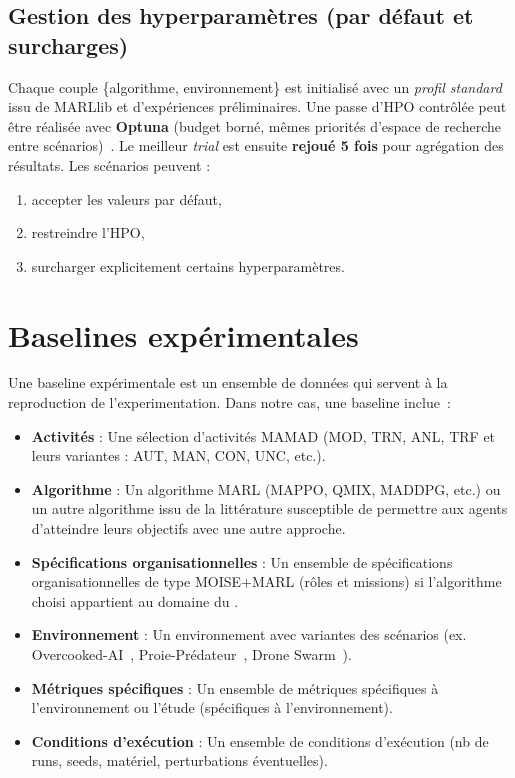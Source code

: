 \subsection{Gestion des hyperparamètres (par défaut et surcharges)}
Chaque couple \{algorithme, environnement\} est initialisé avec un \textit{profil standard} issu de MARLlib et d’expériences préliminaires.
Une passe d’HPO contrôlée peut être réalisée avec \textbf{Optuna} (budget borné, mêmes priorités d’espace de recherche entre scénarios)~\cite{akiba2019optuna}. Le meilleur \textit{trial} est ensuite \textbf{rejoué 5 fois} pour agrégation des résultats.
Les scénarios peuvent :
\begin{enumerate}[label=\alph*)]
  \item accepter les valeurs par défaut,
  \item restreindre l’HPO,
  \item surcharger explicitement certains hyperparamètres.
\end{enumerate}

\section{Baselines expérimentales}

Une baseline expérimentale est un ensemble de données qui servent à la reproduction de l'experimentation. Dans notre cas, une baseline inclue~:
\begin{itemize}
  \item \textbf{Activités} : Une sélection d'activités MAMAD (MOD, TRN, ANL, TRF et leurs variantes : AUT, MAN, CON, UNC, etc.).
  \item \textbf{Algorithme} : Un algorithme MARL (MAPPO, QMIX, MADDPG, etc.) ou un autre algorithme issu de la littérature susceptible de permettre aux agents d'atteindre leurs objectifs avec une autre approche.
  \item \textbf{Spécifications organisationnelles} : Un ensemble de spécifications organisationnelles de type MOISE+MARL (rôles et missions) si l'algorithme choisi appartient au domaine du .
  \item \textbf{Environnement} : Un environnement avec variantes des scénarios (ex. Overcooked-AI~\cite{overcookedai}, Proie-Prédateur~\cite{lowe2017multi}, Drone Swarm~\cite{cage_challenge_3_announcement}).
  \item \textbf{Métriques spécifiques} : Un ensemble de métriques spécifiques à l'environnement ou l'étude (spécifiques à l’environnement).
  \item \textbf{Conditions d’exécution} : Un ensemble de conditions d’exécution (nb de runs, seeds, matériel, perturbations éventuelles).
\end{itemize}

